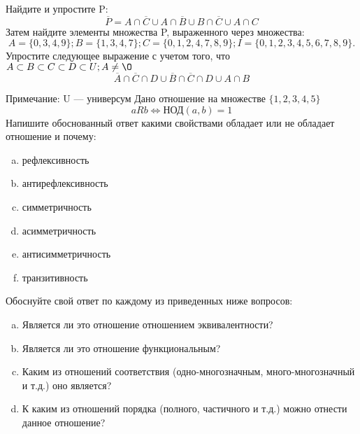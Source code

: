 \documentclass[10pt]{exam}
\begin{document}
\begin{questions}
\question
Найдите и упростите P:
\begin{equation*}
\overline{P} = A \cap \overline{C} \cup A \cap \overline{B} \cup B \cap \overline{C} \cup A \cap C
\end{equation*}
Затем найдите элементы множества P, выраженного через множества:
\begin{equation*}
A = \{0, 3, 4, 9\}; 
B = \{1, 3, 4, 7\};
C = \{0, 1, 2, 4, 7, 8, 9\};
I = \{0, 1, 2, 3, 4, 5, 6, 7, 8, 9\}.
\end{equation*}\question
Упростите следующее выражение с учетом того, что $A\subset B \subset C \subset D \subset U; A \neq \O$
\begin{equation*}
\overline{A} \cap \overline{C} \cap D \cup \overline{B} \cap \overline{C} \cap D \cup A \cap B
\end{equation*}

Примечание: U — универсум\question
Дано отношение на множестве $\{1, 2, 3, 4, 5\}$ 
\begin{equation*}
aRb \iff  \text{НОД}(a,b) =1
\end{equation*}
Напишите обоснованный ответ какими свойствами обладает или не обладает отношение и почему:   
\begin{enumerate} [a)]\setcounter{enumi}{0}
\item рефлексивность
\item антирефлексивность
\item симметричность
\item асимметричность
\item антисимметричность
\item транзитивность
\end{enumerate}

Обоснуйте свой ответ по каждому из приведенных ниже вопросов:
\begin{enumerate} [a)]\setcounter{enumi}{0}
    \item Является ли это отношение отношением эквивалентности?
    \item Является ли это отношение функциональным?
    \item Каким из отношений соответствия (одно-многозначным, много-многозначный и т.д.) оно является?
    \item К каким из отношений порядка (полного, частичного и т.д.) можно отнести данное отношение?
\end{enumerate}



\end{questions}
\end{document}
